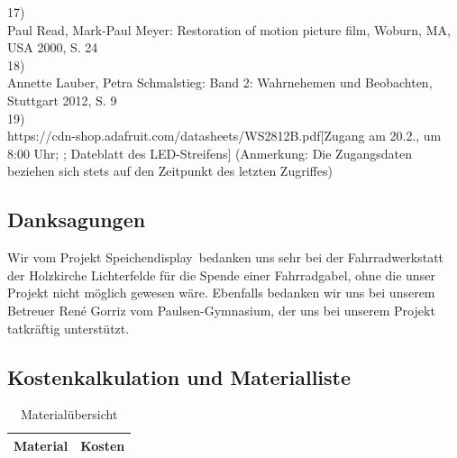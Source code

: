 \documentclass [a4paper, 11pt] {article}
\begin{document}
17)\\
Paul Read, Mark-Paul Meyer: \glqq Restoration of motion picture film\grqq, Woburn, MA, USA 2000, S. 24\\
18)\\
Annette Lauber, Petra Schmalstieg: \glqq Band 2: Wahrnehemen und Beobachten\grqq, Stuttgart 2012, S. 9\\
19) \\
https://cdn-shop.adafruit.com/datasheets/WS2812B.pdf[Zugang am 20.2., um 8:00 Uhr; ; Dateblatt des LED-Streifens]
(Anmerkung: Die Zugangsdaten beziehen sich stets auf den Zeitpunkt des letzten Zugriffes)

\subsection{Danksagungen}
Wir vom Projekt \glqq Speichendisplay\grqq\ bedanken uns sehr bei der Fahrradwerkstatt der Holzkirche Lichterfelde für die Spende einer Fahrradgabel, ohne die unser Projekt nicht möglich gewesen wäre. Ebenfalls bedanken wir uns bei unserem Betreuer René Gorriz vom Paulsen-Gymnasium, der uns bei unserem Projekt tatkräftig unterstützt.
\subsection{Kostenkalkulation und Materialliste}
\begin{table}[H]
	\caption{Materialübersicht}
	\centering
		\begin{tabular}{|c|c|}
			\hline
			 Material & Kosten\\  
			\hline
			
			\hline
		\end{tabular}
	\label{Material}
\end{table}
\end{document}
